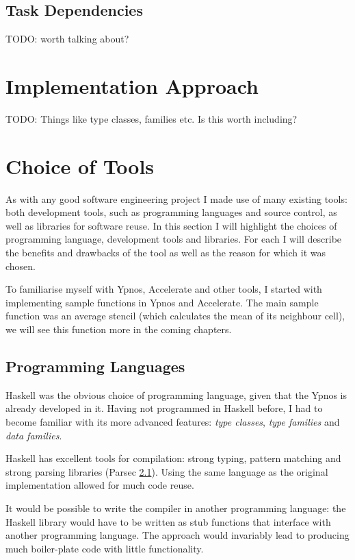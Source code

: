 \documentclass[12pt,a4paper,twoside]{scrbook}
\begin{document}
\subsection{Task Dependencies}

TODO: worth talking about?

\section{Implementation Approach}
TODO: Things like type classes, families etc. Is this worth including?

\section{Choice of Tools}

As with any good software engineering project I made use of many existing tools:
both development tools, such as programming languages and source control, as
well as libraries for software reuse. In this section I will highlight the
choices of programming language, development tools and libraries. For each I
will describe the benefits and drawbacks of the tool as well as the reason for
which it was chosen.

To familiarise myself with Ypnos, Accelerate and other tools, I started with
implementing sample functions in Ypnos and Accelerate. The main sample function was an
average stencil (which calculates the mean of its neighbour cell), we will see
this function more in the coming chapters.

\subsection{Programming Languages}

Haskell was the obvious choice of programming language, given that the Ypnos is
already developed in it. Having not programmed in Haskell before, I had to
become familiar with its more advanced features: \emph{type classes}, \emph{type
  families} and \emph{data families}.

Haskell has excellent tools for compilation: strong typing, pattern matching and
strong parsing libraries (Parsec \ref{}). Using the same language as the
original implementation allowed for much code reuse.

It would be possible to write the compiler in another programming language: the
Haskell library would have to be written as stub functions that interface with another
programming language. The approach would invariably lead to producing much
boiler-plate code with little functionality.
\end{document}
